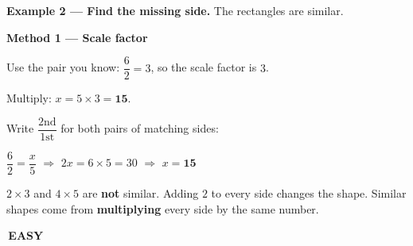 \documentclass[11pt]{article}
\newcommand{\leveltag}[2]{\colorbox{#1}{\color{white}\bfseries\small\,#2\,}}
\begin{document}
\begin{watchme}\textbf{Example 2 --- Find the missing side.} \;The rectangles are similar.\par\vspace{2mm}\begin{minipage}[c]{0.42\linewidth}\centering {}\end{minipage}\hfill\begin{minipage}[c]{0.55\linewidth}{\color{fmwatch}\textbf{Method 1 --- Scale factor}}\par\vspace{1.5mm} Use the pair you know: \;$\dfrac{6}{2} = 3$, so the scale factor is $3$.\par\vspace{1mm} Multiply: \;$x = 5 \times 3 = \mathbf{15}$.\par{}\par\vspace{1.5mm} Write $\dfrac{\text{2nd}}{\text{1st}}$ for both pairs of matching sides:\par\vspace{1mm}$\dfrac{6}{2} = \dfrac{x}{5}$ \;$\Rightarrow$\; $2x = 6 \times 5 = 30$ \;$\Rightarrow$\; $x = \mathbf{15}$\end{minipage}\end{watchme}
\begin{mistake}
$2 \times 3$ and $4 \times 5$ are \textbf{not} similar. Adding $2$ to every side changes the shape.
Similar shapes come from \textbf{multiplying} every side by the same number.
\end{mistake}
\newpage
\leveltag{fmwatch}{EASY}\par\vspace{1mm}{\small Problems 1--5: Are the rectangles similar? If yes, give the scale factor (1st $\to$ 2nd). }\par\vspace{4mm}
\end{document}
